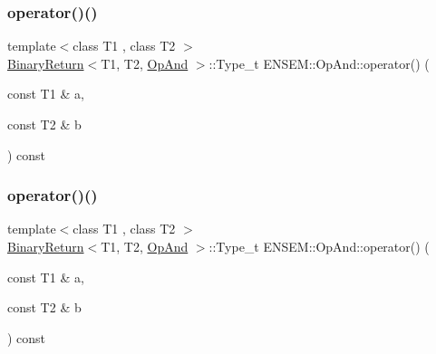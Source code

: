 \subsubsection{\texorpdfstring{operator()()}{operator()()}\hspace{0.1cm}{\footnotesize\ttfamily [1/3]}}
{\footnotesize\ttfamily template$<$class T1 , class T2 $>$ \\
\mbox{\hyperlink{structENSEM_1_1BinaryReturn}{Binary\+Return}}$<$T1, T2, \mbox{\hyperlink{structENSEM_1_1OpAnd}{Op\+And}} $>$\+::Type\+\_\+t E\+N\+S\+E\+M\+::\+Op\+And\+::operator() (\begin{DoxyParamCaption}\item[{const T1 \&}]{a,  }\item[{const T2 \&}]{b }\end{DoxyParamCaption}) const\hspace{0.3cm}{\ttfamily [inline]}}

\mbox{\label{structENSEM_1_1OpAnd_a05e5e9860556ea062a49cdb289806548}} 
\subsubsection{\texorpdfstring{operator()()}{operator()()}\hspace{0.1cm}{\footnotesize\ttfamily [2/3]}}
{\footnotesize\ttfamily template$<$class T1 , class T2 $>$ \\
\mbox{\hyperlink{structENSEM_1_1BinaryReturn}{Binary\+Return}}$<$T1, T2, \mbox{\hyperlink{structENSEM_1_1OpAnd}{Op\+And}} $>$\+::Type\+\_\+t E\+N\+S\+E\+M\+::\+Op\+And\+::operator() (\begin{DoxyParamCaption}\item[{const T1 \&}]{a,  }\item[{const T2 \&}]{b }\end{DoxyParamCaption}) const\hspace{0.3cm}{\ttfamily [inline]}}

\mbox{\label{structENSEM_1_1OpAnd_a05e5e9860556ea062a49cdb289806548}} 
